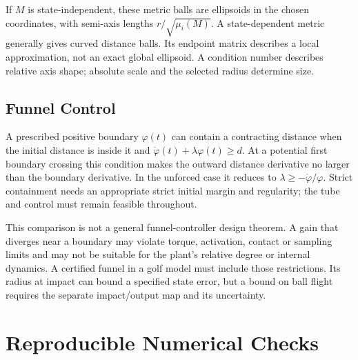 If $M$ is state-independent, these metric balls are ellipsoids in the chosen coordinates, with semi-axis lengths $r/\sqrt{\mu_i(M)}$. A state-dependent metric generally gives curved distance balls. Its endpoint matrix describes a local approximation, not an exact global ellipsoid. A condition number describes relative axis shape; absolute scale and the selected radius determine size.

\subsection{Funnel Control}

A prescribed positive boundary $\varphi(t)$ can contain a contracting distance when the initial distance is inside it and
$\dot\varphi(t)+\lambda\varphi(t)\geq d$.
At a potential first boundary crossing this condition makes the outward distance derivative no larger than the boundary derivative. In the unforced case it reduces to $\lambda\geq-\dot\varphi/\varphi$. Strict containment needs an appropriate strict initial margin and regularity; the tube and control must remain feasible throughout.

This comparison is not a general funnel-controller design theorem. A gain that diverges near a boundary may violate torque, activation, contact or sampling limits and may not be suitable for the plant's relative degree or internal dynamics. A certified funnel in a golf model must include those restrictions. Its radius at impact can bound a specified state error, but a bound on ball flight requires the separate impact/output map and its uncertainty.

\section{Reproducible Numerical Checks}

